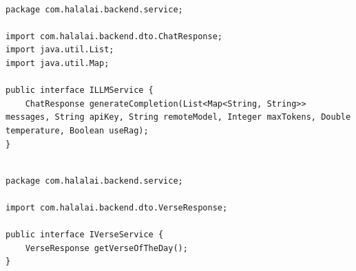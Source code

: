\begin{lstlisting}[basicstyle=\tiny\ttfamily,breaklines=true]

package com.halalai.backend.service;

import com.halalai.backend.dto.ChatResponse;
import java.util.List;
import java.util.Map;

public interface ILLMService {
    ChatResponse generateCompletion(List<Map<String, String>> messages, String apiKey, String remoteModel, Integer maxTokens, Double temperature, Boolean useRag);
}
\end{lstlisting}

\begin{lstlisting}[basicstyle=\tiny\ttfamily,breaklines=true]

package com.halalai.backend.service;

import com.halalai.backend.dto.VerseResponse;

public interface IVerseService {
    VerseResponse getVerseOfTheDay();
}
\end{lstlisting}

